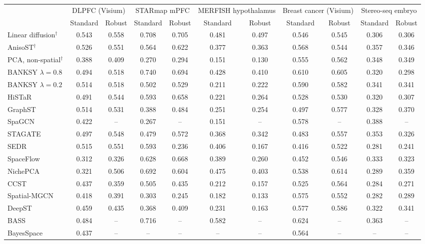 \begin{tabular}{lcccccccccc}
\toprule
 & \multicolumn{2}{c}{DLPFC (Visium)} & \multicolumn{2}{c}{STARmap mPFC} & \multicolumn{2}{c}{MERFISH hypothalamus} & \multicolumn{2}{c}{Breast cancer (Visium)} & \multicolumn{2}{c}{Stereo-seq embryo} \\
 & Standard & Robust & Standard & Robust & Standard & Robust & Standard & Robust & Standard & Robust \\
\midrule
Linear diffusion$^\dagger$ & 0.543 & 0.558 & 0.708 & 0.705 & 0.481 & 0.497 & 0.546 & 0.545 & 0.306 & 0.306 \\
AnisoST$^\dagger$ & 0.526 & 0.551 & 0.564 & 0.622 & 0.377 & 0.363 & 0.568 & 0.544 & 0.357 & 0.346 \\
PCA, non-spatial$^\dagger$ & 0.388 & 0.409 & 0.270 & 0.294 & 0.151 & 0.130 & 0.555 & 0.562 & 0.348 & 0.349 \\
BANKSY $\lambda=0.8$ & 0.494 & 0.518 & 0.740 & 0.694 & 0.428 & 0.410 & 0.610 & 0.605 & 0.320 & 0.298 \\
BANKSY $\lambda=0.2$ & 0.514 & 0.518 & 0.502 & 0.529 & 0.211 & 0.222 & 0.590 & 0.582 & 0.341 & 0.341 \\
HiSTaR & 0.491 & 0.544 & 0.593 & 0.658 & 0.221 & 0.264 & 0.528 & 0.530 & 0.320 & 0.307 \\
GraphST & 0.514 & 0.531 & 0.388 & 0.484 & 0.251 & 0.254 & 0.497 & 0.577 & 0.328 & 0.370 \\
SpaGCN & 0.422 & -- & 0.267 & -- & 0.151 & -- & 0.578 & -- & 0.388 & -- \\
STAGATE & 0.497 & 0.548 & 0.479 & 0.572 & 0.368 & 0.342 & 0.483 & 0.557 & 0.353 & 0.326 \\
SEDR & 0.515 & 0.551 & 0.593 & 0.236 & 0.406 & 0.167 & 0.416 & 0.522 & 0.281 & 0.241 \\
SpaceFlow & 0.312 & 0.326 & 0.628 & 0.668 & 0.389 & 0.260 & 0.452 & 0.546 & 0.333 & 0.323 \\
NichePCA & 0.321 & 0.506 & 0.692 & 0.604 & 0.475 & 0.403 & 0.538 & 0.614 & 0.289 & 0.359 \\
CCST & 0.437 & 0.359 & 0.505 & 0.435 & 0.212 & 0.157 & 0.525 & 0.564 & 0.284 & 0.271 \\
Spatial-MGCN & 0.418 & 0.391 & 0.303 & 0.245 & 0.182 & 0.133 & 0.575 & 0.552 & 0.282 & 0.289 \\
DeepST & 0.459 & 0.435 & 0.368 & 0.409 & 0.231 & 0.163 & 0.577 & 0.586 & 0.322 & 0.341 \\
BASS & 0.484 & -- & 0.716 & -- & 0.582 & -- & 0.624 & -- & 0.363 & -- \\
BayesSpace & 0.437 & -- & -- & -- & -- & -- & 0.564 & -- & -- & -- \\
\bottomrule
\end{tabular}

